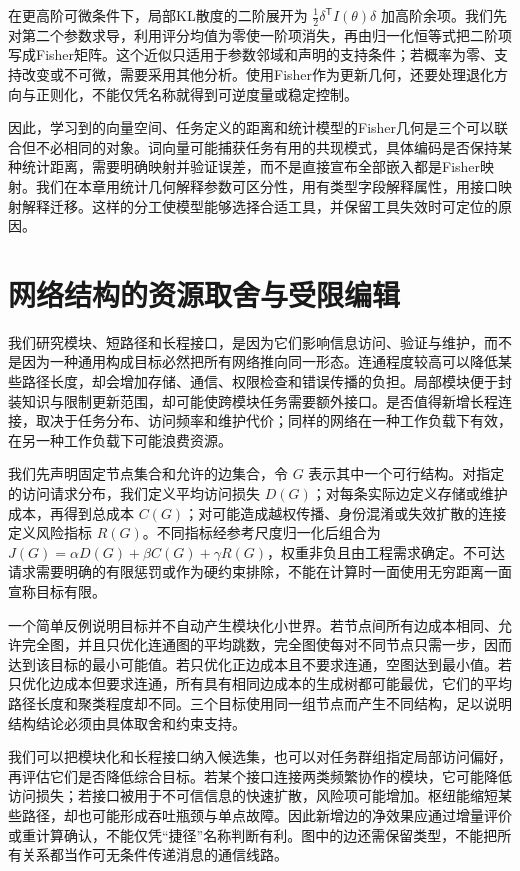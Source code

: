 在更高阶可微条件下，局部KL散度的二阶展开为 $\frac12\delta^{\mathsf T}I(\theta)\delta$ 加高阶余项。我们先对第二个参数求导，利用评分均值为零使一阶项消失，再由归一化恒等式把二阶项写成Fisher矩阵。这个近似只适用于参数邻域和声明的支持条件；若概率为零、支持改变或不可微，需要采用其他分析。使用Fisher作为更新几何，还要处理退化方向与正则化，不能仅凭名称就得到可逆度量或稳定控制。

因此，学习到的向量空间、任务定义的距离和统计模型的Fisher几何是三个可以联合但不必相同的对象。词向量可能捕获任务有用的共现模式，具体编码是否保持某种统计距离，需要明确映射并验证误差，而不是直接宣布全部嵌入都是Fisher映射。我们在本章用统计几何解释参数可区分性，用有类型字段解释属性，用接口映射解释迁移。这样的分工使模型能够选择合适工具，并保留工具失效时可定位的原因。

\section{网络结构的资源取舍与受限编辑}
\label{sec:section_6753}

我们研究模块、短路径和长程接口，是因为它们影响信息访问、验证与维护，而不是因为一种通用构成目标必然把所有网络推向同一形态。连通程度较高可以降低某些路径长度，却会增加存储、通信、权限检查和错误传播的负担。局部模块便于封装知识与限制更新范围，却可能使跨模块任务需要额外接口。是否值得新增长程连接，取决于任务分布、访问频率和维护代价；同样的网络在一种工作负载下有效，在另一种工作负载下可能浪费资源。

我们先声明固定节点集合和允许的边集合，令 $G$ 表示其中一个可行结构。对指定的访问请求分布，我们定义平均访问损失 $D(G)$；对每条实际边定义存储或维护成本，再得到总成本 $C(G)$；对可能造成越权传播、身份混淆或失效扩散的连接定义风险指标 $R(G)$。不同指标经参考尺度归一化后组合为 $J(G)=\alpha D(G)+\beta C(G)+\gamma R(G)$，权重非负且由工程需求确定。不可达请求需要明确的有限惩罚或作为硬约束排除，不能在计算时一面使用无穷距离一面宣称目标有限。

一个简单反例说明目标并不自动产生模块化小世界。若节点间所有边成本相同、允许完全图，并且只优化连通图的平均跳数，完全图使每对不同节点只需一步，因而达到该目标的最小可能值。若只优化正边成本且不要求连通，空图达到最小值。若只优化边成本但要求连通，所有具有相同边成本的生成树都可能最优，它们的平均路径长度和聚类程度却不同。三个目标使用同一组节点而产生不同结构，足以说明结构结论必须由具体取舍和约束支持。

我们可以把模块化和长程接口纳入候选集，也可以对任务群组指定局部访问偏好，再评估它们是否降低综合目标。若某个接口连接两类频繁协作的模块，它可能降低访问损失；若接口被用于不可信信息的快速扩散，风险项可能增加。枢纽能缩短某些路径，却也可能形成吞吐瓶颈与单点故障。因此新增边的净效果应通过增量评价或重计算确认，不能仅凭“捷径”名称判断有利。图中的边还需保留类型，不能把所有关系都当作可无条件传递消息的通信线路。

